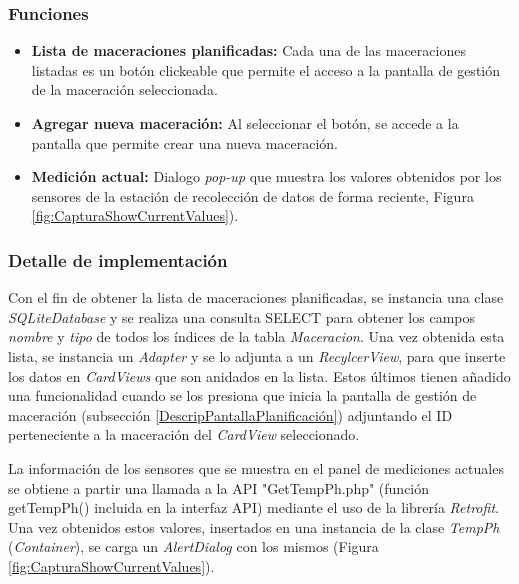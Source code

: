             \subsubsection{Funciones}
                \begin{itemize}
                    \item \textbf{Lista de maceraciones planificadas:} Cada una de las maceraciones listadas es un botón clickeable que permite el acceso a la pantalla de gestión de la maceración seleccionada.
                    
                    \item \textbf{Agregar nueva maceración:} Al seleccionar el botón, se accede a la pantalla que permite crear una nueva maceración.
                    
                    \item \textbf{Medición actual:} Dialogo \textit{pop-up} que muestra los valores obtenidos por los sensores de la estación de recolección de datos de forma reciente, Figura \ref{fig:CapturaShowCurrentValues}).
                \end{itemize}
                
            \subsubsection{Detalle de implementación}
                
                Con el fin de obtener la lista de maceraciones planificadas, se instancia una clase \textit{SQLiteDatabase} y se realiza una consulta SELECT para obtener los campos \textit{nombre} y \textit{tipo} de todos los índices de la tabla \textit{Maceracion}. Una vez obtenida esta lista, se instancia un \textit{Adapter} y se lo adjunta a un \textit{RecylcerView}, para que inserte los datos en \textit{CardViews} que son anidados en la lista. Estos últimos tienen añadido una funcionalidad cuando se los presiona que inicia la pantalla de gestión de maceración (subsección \ref{DescripPantallaPlanificación}) adjuntando el ID perteneciente a la maceración del \textit{CardView} seleccionado.
                
                \par La información de los sensores que se muestra en el panel de mediciones actuales se obtiene a partir una llamada a la API "GetTempPh.php" (función getTempPh() incluida en la interfaz API) mediante el uso de la librería \textit{Retrofit}. Una vez obtenidos estos valores, insertados en una instancia de la clase \textit{TempPh} (\textit{Container}), se carga un \textit{AlertDialog} con los mismos (Figura \ref{fig:CapturaShowCurrentValues}).
                
